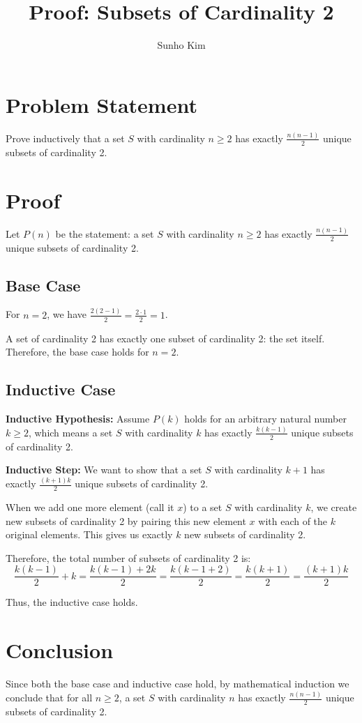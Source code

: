 \documentclass{article}
\title{Proof: Subsets of Cardinality 2}
\author{Sunho Kim}
\date{}
\begin{document}
\maketitle

\section{Problem Statement}
Prove inductively that a set $S$ with cardinality $n \geq 2$ has exactly $\frac{n(n-1)}{2}$ unique subsets of cardinality 2.

\section{Proof}

Let $P(n)$ be the statement: a set $S$ with cardinality $n \geq 2$ has exactly $\frac{n(n-1)}{2}$ unique subsets of cardinality 2.

\subsection{Base Case}
For $n = 2$, we have $\frac{2(2-1)}{2} = \frac{2 \cdot 1}{2} = 1$. 

A set of cardinality 2 has exactly one subset of cardinality 2: the set itself. Therefore, the base case holds for $n = 2$.

\subsection{Inductive Case}
\textbf{Inductive Hypothesis:} Assume $P(k)$ holds for an arbitrary natural number $k \geq 2$, which means a set $S$ with cardinality $k$ has exactly $\frac{k(k-1)}{2}$ unique subsets of cardinality 2.

\textbf{Inductive Step:} We want to show that a set $S$ with cardinality $k+1$ has exactly $\frac{(k+1)k}{2}$ unique subsets of cardinality 2.

When we add one more element (call it $x$) to a set $S$ with cardinality $k$, we create new subsets of cardinality 2 by pairing this new element $x$ with each of the $k$ original elements. This gives us exactly $k$ new subsets of cardinality 2.

Therefore, the total number of subsets of cardinality 2 is:
$$\frac{k(k-1)}{2} + k = \frac{k(k-1) + 2k}{2} = \frac{k(k-1+2)}{2} = \frac{k(k+1)}{2} = \frac{(k+1)k}{2}$$

Thus, the inductive case holds.

\section{Conclusion}
Since both the base case and inductive case hold, by mathematical induction we conclude that for all $n \geq 2$, a set $S$ with cardinality $n$ has exactly $\frac{n(n-1)}{2}$ unique subsets of cardinality 2.
\end{document}
